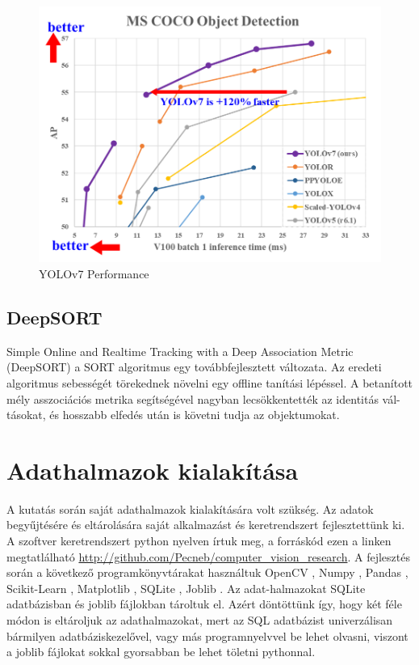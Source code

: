 \documentclass[acmtog, authorversion]{acmart}
\begin{document}
\begin{figure}[H]
 \includegraphics[width=1\columnwidth]{performance.png}
 \caption{YOLOv7 Performance}
 \label{fig: Yolov7chart}
\end{figure}
\subsection{DeepSORT}
Simple Online and Realtime Tracking with a Deep Association Metric (DeepSORT) a SORT algoritmus egy továbbfejlesztett változata. Az eredeti
algoritmus sebességét törekednek növelni egy offline tanítási lépéssel. A betanított mély asszociációs metrika segítségével nagyban lecsökkentették
az identitás vál-tásokat, és hosszabb elfedés után is követni tudja az objektumokat.

\section{Adathalmazok kialakítása}
A kutatás során saját adathalmazok kialakítására volt szükség. Az adatok begyűjtésére és eltárolására saját alkalmazást és keretrendszert
fejlesztettünk ki. A szoftver keretrendszert python nyelven írtuk meg, a forráskód ezen a linken megtatlálható \url{http://github.com/Pecneb/computer_vision_research}.
A fejlesztés során a következő programkönyvtárakat használtuk OpenCV \cite{opencv_library}, Numpy \cite{harris2020array}, Pandas \cite{reback2020pandas}, 
Scikit-Learn \cite{scikit-learn}, Matplotlib \cite{Hunter:2007}, SQLite \cite{sqlite2020hipp}, Joblib \cite{joblib_library}. Az adat-halmazokat SQLite adatbázisban és
joblib fájlokban tároltuk el. Azért döntöttünk így, hogy két féle módon is eltároljuk az adathalmazokat, mert az SQL adatbázist univerzálisan
bármilyen adatbáziskezelővel, vagy más programnyelvvel be lehet olvasni, viszont a joblib fájlokat sokkal gyorsabban be lehet töletni pythonnal.
\end{document}
